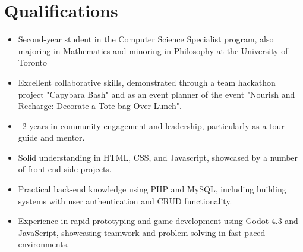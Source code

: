 \documentclass[a4paper,10pt]{article} %
\makeatletter
\newenvironment{jobshort}[2]
{
    \begin{tabularx}{\linewidth}{@{}l X r@{}}
    \textbf{#1} & \hfill &  #2 \\[3.75pt]
    \end{tabularx}
}
{
}
\newenvironment{joblong}[2]
{
    \begin{tabularx}{\linewidth}{@{}l X r@{}}
    \textbf{#1} & \hfill &  #2 \\[3.75pt]
    \end{tabularx}
    \begin{minipage}[t]{\linewidth}
    \begin{itemize}[nosep,after=\strut, leftmargin=1em, itemsep=3pt,label=--]
}
{
    \end{itemize}
    \end{minipage}
}
\makeatother
\begin{document}



    \section{Qualifications}
    \begin{itemize}
        \item Second-year student in the Computer Science Specialist program, also majoring in Mathematics and minoring in Philosophy at the University of Toronto
        \item Excellent collaborative skills, demonstrated through a team hackathon project "Capybara Bash" and as an event planner of the event "Nourish and Recharge: Decorate a Tote-bag Over Lunch".
        \item ~2 years in community engagement and leadership, particularly as a tour guide and mentor.
        \item Solid understanding in HTML, CSS, and Javascript, showcased by a number of front-end side projects.
        \item Practical back-end knowledge using PHP and MySQL, including building systems with user authentication and CRUD functionality.
        \item Experience in rapid prototyping and game development using Godot 4.3 and JavaScript, showcasing teamwork and problem-solving in fast-paced environments.
    \end{itemize}
\end{document}
